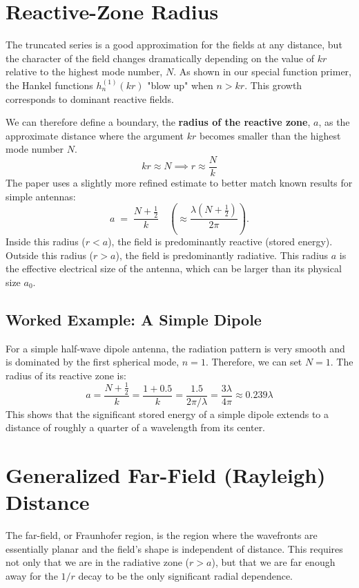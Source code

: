 \documentclass[11pt]{article}
\begin{document}
\section{Reactive-Zone Radius}

The truncated series is a good approximation for the fields at any distance, but the character of the field changes dramatically depending on the value of $kr$ relative to the highest mode number, $N$. As shown in our special function primer, the Hankel functions $h_n^{(1)}(kr)$ "blow up" when $n > kr$. This growth corresponds to dominant reactive fields.

We can therefore define a boundary, the \textbf{radius of the reactive zone}, $a$, as the approximate distance where the argument $kr$ becomes smaller than the highest mode number $N$.
\[
kr \approx N \implies r \approx \frac{N}{k}
\]
The paper uses a slightly more refined estimate to better match known results for simple antennas:
\begin{equation}\label{eq:reactive_radius}
a \;=\;\frac{N+\tfrac12}{k}
\quad\left(\approx\frac{\lambda(N+\tfrac12)}{2\pi}\right).
\end{equation}
Inside this radius ($r < a$), the field is predominantly reactive (stored energy). Outside this radius ($r > a$), the field is predominantly radiative. This radius $a$ is the effective electrical size of the antenna, which can be larger than its physical size $a_0$.

\subsection{Worked Example: A Simple Dipole}
For a simple half-wave dipole antenna, the radiation pattern is very smooth and is dominated by the first spherical mode, $n=1$. Therefore, we can set $N=1$. The radius of its reactive zone is:
\[ a = \frac{N+\tfrac12}{k} = \frac{1+0.5}{k} = \frac{1.5}{2\pi/\lambda} = \frac{3\lambda}{4\pi} \approx 0.239\lambda \]
This shows that the significant stored energy of a simple dipole extends to a distance of roughly a quarter of a wavelength from its center.

\section{Generalized Far-Field (Rayleigh) Distance}

The far-field, or Fraunhofer region, is the region where the wavefronts are essentially planar and the field's shape is independent of distance. This requires not only that we are in the radiative zone ($r > a$), but that we are far enough away for the $1/r$ decay to be the only significant radial dependence.
\end{document}

